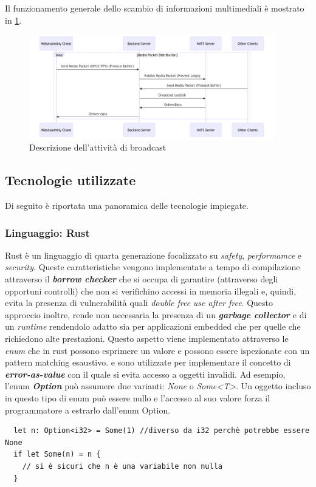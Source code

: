 \documentclass{article}
\begin{document}
Il funzionamento generale dello scambio di informazioni multimediali è mostrato in 
\cref{fig:sq-media}.

\begin{figure}
  \begin{center}
    \includegraphics[width=0.95\textwidth]{figures/sq_media_delivery.png}
  \end{center}
  \caption{Descrizione dell'attività di broadcast}\label{fig:sq-media}
\end{figure}



\subsection{Tecnologie utilizzate}
Di seguito è riportata una panoramica delle tecnologie impiegate. 

\subsubsection{Linguaggio: Rust}
Rust è un linguaggio di quarta generazione focalizzato su \textit{safety}, \textit{performamce}
e \textit{security}. Queste caratteristiche vengono implementate a tempo di compilazione 
attraverso il \textbf{\textit{borrow checker}} che si occupa di garantire (attraverso degli 
opportuni controlli) che non si verifichino accessi in memoria illegali e, quindi, evita la 
presenza di vulnerabilità quali \textit{double free} \textit{use after free}. Questo approccio 
inoltre, rende non necessaria la presenza di un \textbf{\textit{garbage collector}} e di un 
\textit{runtime} rendendolo adatto sia per applicazioni embedded che per quelle che richiedono 
alte prestazioni. Questo aspetto viene implementato attraverso le \textit{enum} che in rust
possono esprimere un valore e possono essere ispezionate con un pattern matching esaustivo. 
e sono utilizzate per implementare il concetto di \textbf{\textit{error-as-value}}
con il quale si evita accesso a oggetti invalidi. Ad esempio, l'enum \textbf{\textit{Option}}
può assumere due varianti: \textit{None} o \textit{Some<T>}. Un oggetto incluso in questo
tipo di enum può essere nullo e l'accesso al suo valore forza il programmatore a estrarlo
dall'enum Option. 
\begin{verbatim}
  let n: Option<i32> = Some(1) //diverso da i32 perchè potrebbe essere None
  if let Some(n) = n {
    // si è sicuri che n è una variabile non nulla
  }
\end{verbatim}
\end{document}
